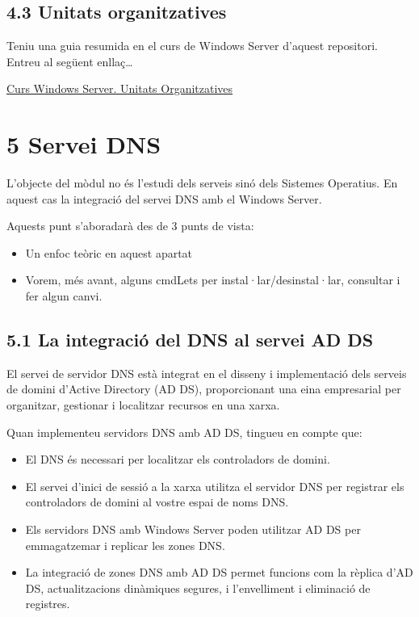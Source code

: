 \documentclass[
  a4paper,
]{article}
\providecommand{\tightlist}{%
  \setlength{\itemsep}{0pt}\setlength{\parskip}{0pt}}
\begin{document}
\subsection{4.3 Unitats organitzatives}\label{unitats-organitzatives}

Teniu una guia resumida en el curs de Windows Server d'aquest
repositori. Entreu al següent enllaç\ldots{}

\href{https://github.com/tofermos/Windows-Server/blob/main/md/UnitºatsOrganitzatives.md}{Curs
Windows Server. Unitats Organitzatives}

\section{5 Servei DNS}\label{servei-dns}

L'objecte del mòdul no és l'estudi dels serveis sinó dels Sistemes
Operatius. En aquest cas la integració del servei DNS amb el Windows
Server.

Aquests punt s'aboradarà des de 3 punts de vista:

\begin{itemize}
\tightlist
\item
  Un enfoc teòric en aquest apartat
\item
  Vorem, més avant, alguns cmdLets per instal·lar/desinstal·lar,
  consultar i fer algun canvi.
\end{itemize}

\subsection{5.1 La integració del DNS al servei AD
DS}\label{la-integraciuxf3-del-dns-al-servei-ad-ds}

El servei de servidor DNS està integrat en el disseny i implementació
dels serveis de domini d'Active Directory (AD DS), proporcionant una
eina empresarial per organitzar, gestionar i localitzar recursos en una
xarxa.

Quan implementeu servidors DNS amb AD DS, tingueu en compte que:

\begin{itemize}
\tightlist
\item
  El DNS és necessari per localitzar els controladors de domini.
\item
  El servei d'inici de sessió a la xarxa utilitza el servidor DNS per
  registrar els controladors de domini al vostre espai de noms DNS.
\item
  Els servidors DNS amb Windows Server poden utilitzar AD DS per
  emmagatzemar i replicar les zones DNS.
\item
  La integració de zones DNS amb AD DS permet funcions com la rèplica
  d'AD DS, actualitzacions dinàmiques segures, i l'envelliment i
  eliminació de registres.
\end{itemize}
\end{document}
